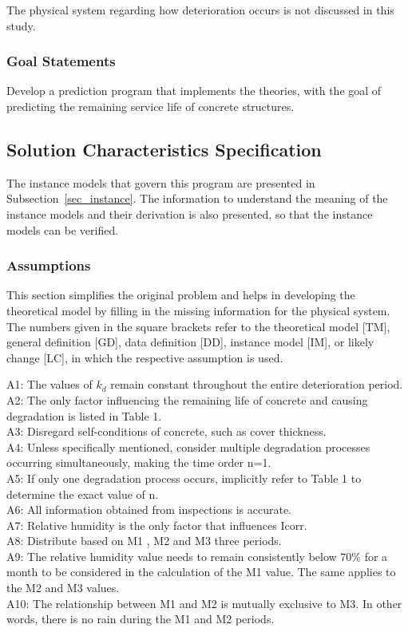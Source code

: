 \documentclass[12pt]{article}
\begin{document}
The physical system regarding how deterioration occurs is not discussed in this study.

\subsubsection{Goal Statements}

Develop a prediction program that implements the theories, with the goal of predicting the remaining service life of concrete structures.

\subsection{Solution Characteristics Specification}

The instance models that govern this program are presented in
Subsection~\ref{sec_instance}.  The information to understand the meaning of the
instance models and their derivation is also presented, so that the instance
models can be verified.

\subsubsection{Assumptions} \label{sec_assumpt}

This section simplifies the original problem and helps in developing the theoretical model by filling in the missing information for the physical system. The numbers given in the square brackets refer to the theoretical model [TM],
general definition [GD], data definition [DD], instance model [IM], or likely change [LC], in which the respective assumption is used.

\begin{itemize}

A1: The values of $k_d$ remain constant throughout the entire deterioration period. \\
A2: The only factor influencing the remaining life of concrete and causing degradation is listed in Table 1. \\
A3: Disregard self-conditions of concrete, such as cover thickness. \\
A4: Unless specifically mentioned, consider multiple degradation processes occurring simultaneously, making the time order n=1. \\
A5: If only one degradation process occurs, implicitly refer to Table 1 to determine the exact value of n.\\
A6: All information obtained from inspections is accurate. \\
A7: Relative humidity is the only factor that influences Icorr. \\
A8: Distribute based on M1 , M2 and M3 three periods. \\
A9: The relative humidity value needs to remain consistently below 70\% for a month to be considered in the calculation of the M1 value. The same applies to the M2 and M3 values. \\
A10: The relationship between M1 and M2 is mutually exclusive to M3. In other words, there is no rain during the M1 and M2 periods.

\end{itemize}
\end{document}
